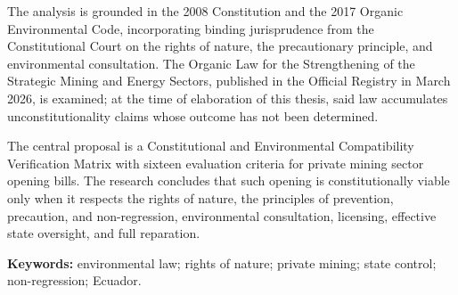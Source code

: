 The analysis is grounded in the 2008 Constitution and the 2017 Organic Environmental Code, incorporating binding jurisprudence from the Constitutional Court on the rights of nature, the precautionary principle, and environmental consultation. The Organic Law for the Strengthening of the Strategic Mining and Energy Sectors, published in the Official Registry in March 2026, is examined; at the time of elaboration of this thesis, said law accumulates unconstitutionality claims whose outcome has not been determined.

The central proposal is a Constitutional and Environmental Compatibility Verification Matrix with sixteen evaluation criteria for private mining sector opening bills. The research concludes that such opening is constitutionally viable only when it respects the rights of nature, the principles of prevention, precaution, and non-regression, environmental consultation, licensing, effective state oversight, and full reparation.

\textbf{Keywords:} environmental law; rights of nature; private mining; state control; non-regression; Ecuador.

\clearpage
{}